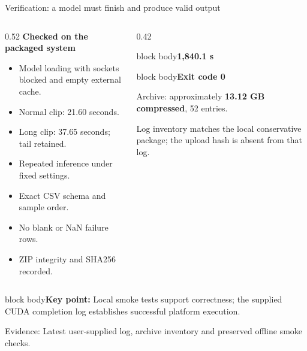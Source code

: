 \documentclass[aspectratio=169,11pt]{beamer}
\newcommand{\takeaway}[1]{\vfill\begin{beamercolorbox}[sep=2mm,wd=\linewidth]{block body}\small\textbf{Key point:} #1\end{beamercolorbox}}
\newcommand{\evidence}[1]{\vspace{1mm}\par{\tiny\color{slate}Evidence: #1\par}}
\newcommand{\metric}[2]{\begin{beamercolorbox}[sep=3mm,center,wd=\linewidth]{block body}{\LARGE\bfseries\color{teal}#1}\par\vspace{1mm}{\small #2}\end{beamercolorbox}}
\begin{document}
\begin{frame}{Verification: a model must finish and produce valid output}
\begin{columns}[T]
\begin{column}{0.52\textwidth}
\textbf{Checked on the packaged system}
\begin{itemize}\item Model loading with sockets blocked and empty external cache.
\item Normal clip: 21.60 seconds.
\item Long clip: 37.65 seconds; tail retained.
\item Repeated inference under fixed settings.
\item Exact CSV schema and sample order.
\item No blank or NaN failure rows.
\item ZIP integrity and SHA256 recorded.
\end{itemize}
\end{column}
\begin{column}{0.42\textwidth}
\metric{1,840.1 s}{Measured competition CUDA run}
\vspace{4mm}
\metric{Exit code 0}{submission.csv found by runner}
\vspace{4mm}\small
Archive: approximately \textbf{13.12 GB compressed}, 52 entries.\par
\vspace{2mm}Log inventory matches the local conservative package; the upload hash is absent from that log.
\end{column}
\end{columns}
\takeaway{Local smoke tests support correctness; the supplied CUDA completion log establishes successful platform execution.}
\evidence{Latest user-supplied log, archive inventory and preserved offline smoke checks.}
\end{frame}
\end{document}
